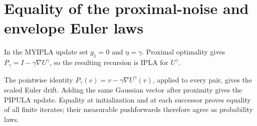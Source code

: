 \documentclass[11pt,a4paper]{article}
\begin{document}
\section{\texorpdfstring{Equality of the proximal-noise and envelope Euler laws}{Equality of the proximal-noise and envelope Euler laws}}


In the MYIPLA update set \(g_1=0\) and \(\eta=\gamma\). Proximal optimality gives \(P_\gamma=I-\gamma\nabla U^\gamma\), so the resulting recursion is IPLA for \(U^\gamma\).



The pointwise identity \(P_\gamma(v)=v-\gamma\nabla U^\gamma(v)\), applied to every pair, gives the scaled Euler drift. Adding the same Gaussian vector after proximity gives the PIPULA update. Equality at initialization and at each successor proves equality of all finite iterates; their measurable pushforwards therefore agree as probability laws.
\end{document}
